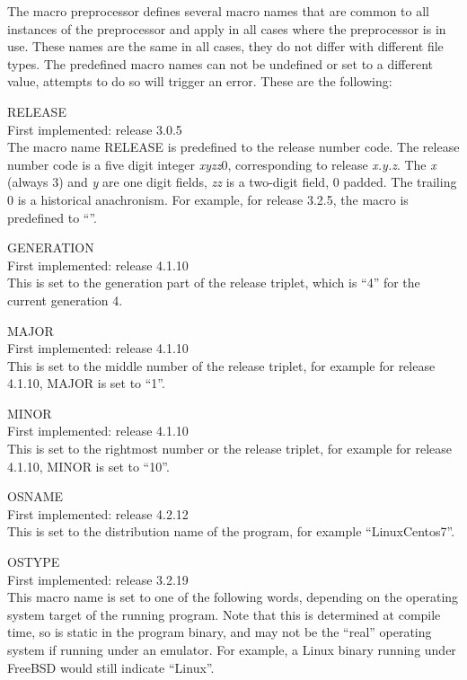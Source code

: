 The macro preprocessor defines several macro names that are common to
all instances of the preprocessor and apply in all cases where the
preprocessor is in use.  These names are the same in all cases, they
do not differ with different file types.  The predefined macro names
can not be undefined or set to a different value, attempts to do so
will trigger an error.  These are the following:

\begin{description}
\item{\vt RELEASE}\\
First implemented: release 3.0.5\\
The macro name {\vt RELEASE} is predefined to the release number code. 
The release number code is a five digit integer {\it xyzz\/}0,
corresponding to release {\it x.y.z}.  The {\it x} (always 3) and {\it
y} are one digit fields, {\it zz} is a two-digit field, 0 padded.  The
trailing 0 is a historical anachronism.  For example, for release
3.2.5, the macro is predefined to ``{}''.

\item{\vt GENERATION}\\
First implemented: release 4.1.10\\
This is set to the generation part of the release triplet, which is
``4'' for the current generation 4.

\item{\vt MAJOR}\\
First implemented: release 4.1.10\\
This is set to the middle number of the release triplet, for 
example for release 4.1.10, {\vt MAJOR} is set to ``1''.

\item{\vt MINOR}\\
First implemented: release 4.1.10\\
This is set to the rightmost number or the release triplet, for
example for release 4.1.10, {\vt MINOR} is set to ``10''.

\item{\vt OSNAME}\\
First implemented: release 4.2.12\\
This is set to the distribution name of the program, for example
``{\vt LinuxCentos7}''.

\item{\vt OSTYPE}\\
First implemented: release 3.2.19\\
This macro name is set to one of the following words, depending on the
operating system target of the running program.  Note that this is
determined at compile time, so is static in the program binary, and
may not be the ``real'' operating system if running under an emulator. 
For example, a Linux binary running under FreeBSD would still indicate
``{\vt Linux}''.


\end{description}
